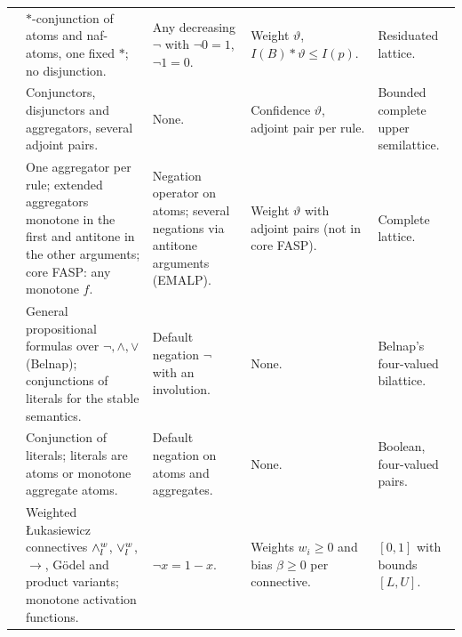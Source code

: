 {\begin{longtable}{@{}p{}p{}p{}p{}p{}@{}}
            \cite{MadridO12}                                 & $\ast$-conjunction of atoms and naf-atoms, one fixed $\ast$; no disjunction.                                                                       & Any decreasing $\neg$ with $\neg0=1$, $\neg1=0$.                                                   & Weight $\vartheta$, $I(B)\ast\vartheta\leq I(p)$.                                               & Residuated lattice.                                   \\
            \cite{MedinaOV01}                                & Conjunctors, disjunctors and aggregators, several adjoint pairs.                                                                                   & None.                                                                                              & Confidence $\vartheta$, adjoint pair per rule.                                                  & Bounded complete upper semilattice.                   \\
            \cite{CornejoLM18,CornejoLM20,CornejoLM20math}   & One aggregator per rule; extended aggregators monotone in the first and antitone in the other arguments; core FASP: any monotone $f$.              & Negation operator on atoms; several negations via antitone arguments (EMALP).                      & Weight $\vartheta$ with adjoint pairs (not in core FASP).                                       & Complete lattice.                                     \\
            \cite{HeyninckAB22arxiv}                         & General propositional formulas over $\neg,\land,\lor$ (Belnap); conjunctions of literals for the stable semantics.                                 & Default negation $\neg$ with an involution.                                                        & None.                                                                                           & Belnap's four-valued bilattice.                       \\
            \cite{PelovT04}                                  & Conjunction of literals; literals are atoms or monotone aggregate atoms.                                                                           & Default negation on atoms and aggregates.                                                          & None.                                                                                           & Boolean, four-valued pairs.                           \\
            \cite{RiegelEtAl20}                              & Weighted Łukasiewicz connectives $\land_l^{w}$, $\lor_l^{w}$, $\to$, Gödel and product variants; monotone activation functions.                & $\neg x=1-x$.                                                                                      & Weights $w_i\geq0$ and bias $\beta\geq0$ per connective.                                        & $[0,1]$ with bounds $[L,U]$.                          \\

\end{longtable}}

